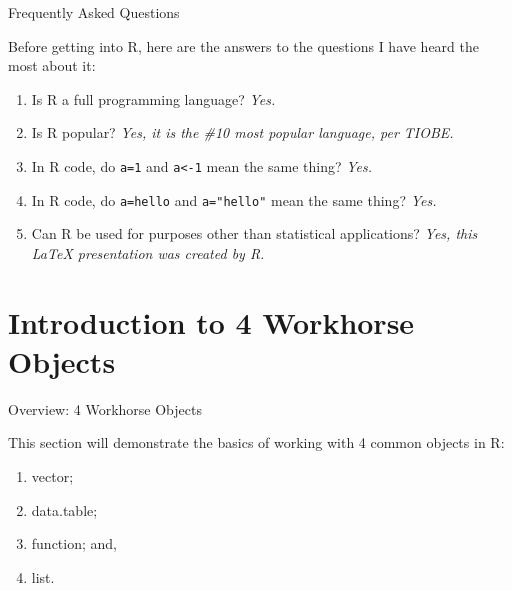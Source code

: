\documentclass[10pt,ignorenonframetext,]{beamer}
\providecommand{\tightlist}{%
\setlength{\itemsep}{0pt}\setlength{\parskip}{0pt}}
\begin{document}
\begin{frame}[fragile]{Frequently Asked Questions}

Before getting into R, here are the answers to the questions I have
heard the most about it:

\begin{enumerate}
\def\labelenumi{\arabic{enumi}.}
\tightlist
\item
  Is R a full programming language? \emph{Yes.}
\item
  Is R popular? \emph{Yes, it is the \#10 most popular language, per
  TIOBE.}
\item
  In R code, do \texttt{a=1} and \texttt{a\textless{}-1} mean the same
  thing? \emph{Yes.}
\item
  In R code, do \texttt{a=\textquotesingle{}hello\textquotesingle{}} and
  \texttt{a="hello"} mean the same thing? \emph{Yes.}
\item
  Can R be used for purposes other than statistical applications?
  \emph{Yes, this LaTeX presentation was created by R.}
\end{enumerate}

\end{frame}

\section{Introduction to 4 Workhorse
Objects}\label{introduction-to-4-workhorse-objects}

\begin{frame}{Overview: 4 Workhorse Objects}

This section will demonstrate the basics of working with 4 common
objects in R:

\begin{enumerate}
\def\labelenumi{\arabic{enumi}.}
\tightlist
\item
  vector;
\item
  data.table;
\item
  function; and,
\item
  list.
\end{enumerate}

\end{frame}
\end{document}
